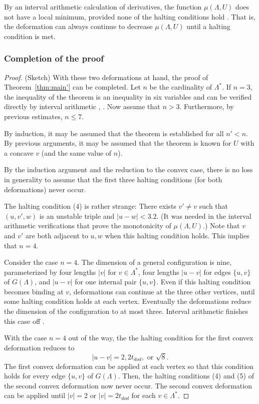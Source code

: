 \documentclass{article} %
\begin{document}
By an interval arithmetic calculation of derivatives,
the function $\mu(\Lambda,U)$ does not have a local
minimum, provided none of the halting conditions hold
\cite[Lemma~7.10]{Hales:2002:Dodec}.  That is, the deformation can always continue
to decrease $\mu(\Lambda,U)$ until a halting condition is met.

\subsubsection{Completion of the proof}

\begin{proof} (Sketch) With these two deformations at hand, the proof
of Theorem~\ref{thm:main'} can be completed. Let $n$ be the
cardinality of $\Lambda^*$. If $n=3$, the inequality of the theorem is
an inequality in six variables and can be verified directly by
interval arithmetic \cite{McLaughlin:2008:KeplerCode},
\cite[\S7.4.1]{Hales:2002:Dodec}. Now assume that $n>3$. Furthermore,
by previous estimates, $n\le 7$.


By induction, it may be assumed that
the theorem is established for all $n'<n$.  By previous arguments,
it may be assumed that the theorem is known for $U$ with a concave
$v$ (and the same value of $n$).

By the induction argument and the reduction to the convex case,
there is no loss in generality to assume that the first three
halting conditions (for both deformations) never occur.  

The  halting condition (4) is rather strange:
There exists $v'\ne v$ such that 
$(u,v',w)$ is an unstable triple and $|u-w|<3.2$.
(It was needed in the interval arithmetic verifications
that prove the monotonicity of $\mu(\Lambda,U)$.)  Note
that $v$ and $v'$ are both adjacent to $u,w$ when this
halting condition holds.  This implies that $n=4$.  

Consider the case $n=4$.  The dimension of a general configuration
is nine, parameterized by four lengths $|v|$ for $v\in\Lambda^*$,
four lengths $|u-v|$ for edges $\{u,v\}$ of $G(\Lambda)$, and $|u-v|$
for one internal pair $\{u,v\}$.
Even
if this halting condition becomes binding at $v$, deformations
can continue at the three other vertices, until some halting
condition holds at each vertex.  Eventually the deformations
reduce the dimension of the configuration to at most three.
Interval arithmetic finishes this case off \cite[\S7.4.2]{Hales:2002:Dodec}.

With the case $n=4$ out of the way, the
the halting condition for the first convex deformation
reduces to
  $$
  |u-v| = 2, 2t_{dod}, \text{ or } \sqrt8.
  $$
The first convex deformation can be applied at each vertex 
so that this condition holds for every edge $\{u,v\}$ of $G(\Lambda)$.
Then, the halting conditions (4) and (5) of the second convex
deformation now never occur.  The second convex deformation can
be applied until $|v|=2$ or $|v|=2t_{dod}$ for each $v\in\Lambda^*$.


\end{proof}
\end{document}
